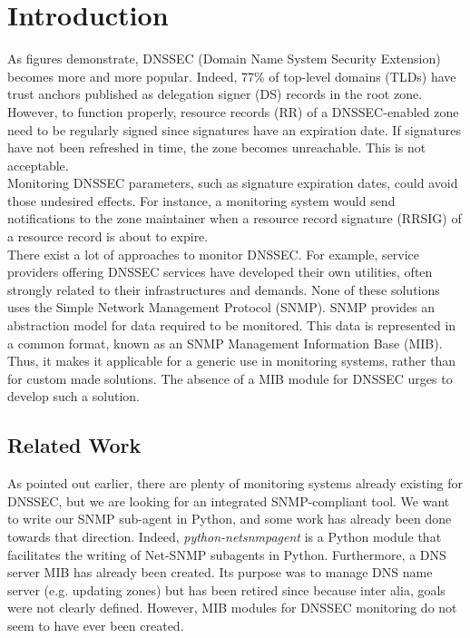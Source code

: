 \section{Introduction}
\label{chap:introduction}
As figures demonstrate, DNSSEC (Domain Name System Security Extension) becomes more and more popular. Indeed, 77\% of top-level domains (TLDs) have trust anchors published as delegation signer (DS) records in the root zone\cite{stats}. However, to function properly, resource records (RR) of a DNSSEC-enabled zone need to be regularly signed since signatures have an expiration date. If signatures have not been refreshed in time, the zone becomes unreachable. This is not acceptable.
\\
Monitoring DNSSEC parameters, such as signature expiration dates, could avoid those undesired effects. For instance, a monitoring system would send notifications to the zone maintainer when a resource record signature (RRSIG) of a resource record is about to expire.
\\
There exist a lot of approaches to monitor DNSSEC. For example, service providers offering DNSSEC services have developed their own utilities, often strongly related to their infrastructures and demands. None of these solutions uses the Simple Network Management Protocol (SNMP). SNMP provides an abstraction model for data required to be monitored. This data is represented in a common format, known as an SNMP Management Information Base (MIB). Thus, it makes it applicable for a generic use in monitoring systems, rather than for custom made solutions. The absence of a MIB module for DNSSEC urges to develop such a solution.

\subsection{Related Work}
As pointed out earlier, there are plenty of monitoring systems already existing for DNSSEC\cite{list}, but we are looking for an integrated SNMP-compliant tool. We want to write our SNMP sub-agent in Python, and some work has already been done towards that direction. Indeed, \textit{python-netsnmpagent}\cite{pythonnetsnmpagent} is a Python module that facilitates the writing of Net-SNMP subagents in Python.
Furthermore, a DNS server MIB\cite{dnsmib} has already been created. Its purpose was to manage DNS name server (e.g. updating zones) but has been retired since\cite{dnsmib_retire} because inter alia, goals were not clearly defined. However, MIB modules for DNSSEC monitoring do not seem to have ever been created.


